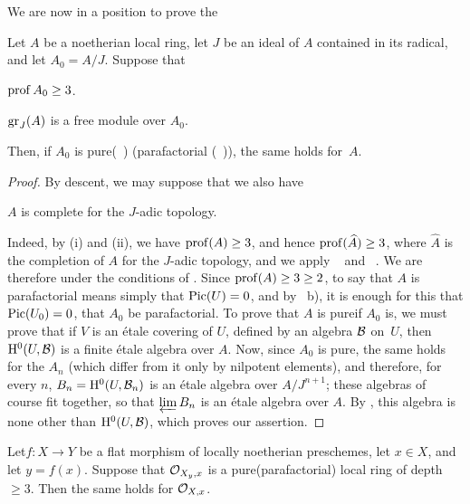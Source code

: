 We are now in a position to prove the
\enlargethispage{-1\baselineskip}%
\begin{theoreme} \label{XII.4.7}
Let $A$ be a noetherian local ring, let $J$ be an ideal of $A$ contained in its radical, and let $A_0=A/J$. Suppose that
\begin{enumeratei}
\item
$\operatorname{prof} A_0\geq 3$.
\item
$\operatorname{gr}_J(A)$ is a free module over $A_0$.
\end{enumeratei}
\noindent
Then, if $A_0$ is \og pure\fg (~) (\resp parafactorial (~)), the same holds for~$A$.
\end{theoreme}

\begin{proof}
By descent, we may suppose that we also have
\begin{enumeratei}\setcounter{enumi}{2}
\item
$A$ is complete for the $J$-adic topology.
\end{enumeratei}

Indeed, by (i) and (ii), we have $\operatorname{prof}(A)\geq 3$, and hence $\operatorname{prof}(\widehat{A})\geq 3$, where $\widehat{A}$ is the completion of $A$ for the $J$-adic topology, and we apply ~ and ~. We are therefore under the conditions of . Since $\operatorname{prof}(A)\geq 3\geq 2$, to say that $A$ is parafactorial means simply that $\operatorname{Pic}(U)=0$, and by ~b), it is enough for this that $\operatorname{Pic}(U_0)=0$, \ie that $A_0$ be parafactorial. To prove that $A$ is \og pure\fg if $A_0$ is, we must prove that if $V$ is an \'etale covering of $U$, defined by an algebra $\mathcal B$ on~$U$, then $\mathrm H^0(U, \mathcal B)$ is a finite \'etale algebra over $A$. Now, since $A_0$ is pure, the same holds for the $A_n$ (which differ from it only by nilpotent elements), and therefore, for every $n$, $B_n=\mathrm H^0(U, \mathcal B_n)$ is an \'etale algebra over $A/J^{n+1}$; these algebras of course fit together, so that $\varprojlim B_n$ is an \'etale algebra over $A$. By , this algebra is none other than $\mathrm H^0(U, \mathcal B)$, which proves our assertion.
\skipqed
\end{proof}

\begin{corollaire} \label{XII.4.8}
Let\pageoriginale $f:X\to Y$ be a flat morphism of locally noetherian preschemes, let $x\in X$, and let $y=f(x)$. Suppose that $\mathcal O_{X_y, x}$ is a \og pure\fg (\resp parafactorial) local ring of depth $\geq 3$. Then the same holds for $\mathcal O_{X, x}$.
\end{corollaire}

